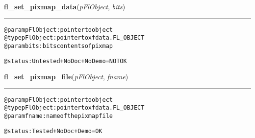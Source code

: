     \label{xformslib:flbitmap:fl_set_pixmap_data}

    \vspace{0.5ex}

\hspace{.8\funcindent}\begin{boxedminipage}{\funcwidth}

    \raggedright \textbf{fl\_set\_pixmap\_data}(\textit{pFlObject}, \textit{bits})

    \vspace{-1.5ex}

    \rule{\textwidth}{0.5\fboxrule}
\setlength{\parskip}{2ex}
\begin{alltt}
        @param pFlObject: pointer to object
@type pFlObject: pointer to xfdata.FL\_OBJECT
        @param bits: bits contents of pixmap

        @status: Untested + NoDoc + NoDemo = NOT OK
    
\end{alltt}

\setlength{\parskip}{1ex}
    \end{boxedminipage}

    \label{xformslib:flbitmap:fl_set_pixmap_file}

    \vspace{0.5ex}

\hspace{.8\funcindent}\begin{boxedminipage}{\funcwidth}

    \raggedright \textbf{fl\_set\_pixmap\_file}(\textit{pFlObject}, \textit{fname})

    \vspace{-1.5ex}

    \rule{\textwidth}{0.5\fboxrule}
\setlength{\parskip}{2ex}
\begin{alltt}
        @param pFlObject: pointer to object
@type pFlObject: pointer to xfdata.FL\_OBJECT
        @param fname: name of the pixmap file

        @status: Tested + NoDoc + Demo = OK
    
\end{alltt}

\setlength{\parskip}{1ex}
    \end{boxedminipage}

